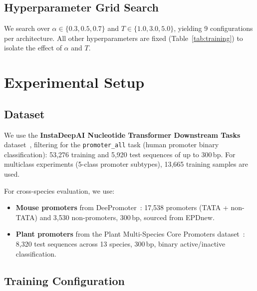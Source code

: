 \documentclass[conference]{IEEEtran}
\begin{document}
\subsection{Hyperparameter Grid Search}

We search over $\alpha \in \{0.3, 0.5, 0.7\}$ and $T \in \{1.0, 3.0, 5.0\}$, yielding 9 configurations per architecture. All other hyperparameters are fixed (Table~\ref{tab:training}) to isolate the effect of $\alpha$ and $T$.

\section{Experimental Setup}
\label{sec:setup}

\subsection{Dataset}

We use the \textbf{InstaDeepAI Nucleotide Transformer Downstream Tasks} dataset~\cite{dallatorre2023nucleotide, instadeep2023dataset}, filtering for the \texttt{promoter\_all} task (human promoter binary classification): 53,276 training and 5,920 test sequences of up to 300\,bp. For multiclass experiments (5-class promoter subtypes), 13,665 training samples are used.

For cross-species evaluation, we use:
\begin{itemize}
    \item \textbf{Mouse promoters} from DeePromoter~\cite{oubounyt2019deepromoter}: 17,538 promoters (TATA + non-TATA) and 3,530 non-promoters, 300\,bp, sourced from EPDnew.
    \item \textbf{Plant promoters} from the Plant Multi-Species Core Promoters dataset~\cite{zhangtaolab2024plant}: 8,320 test sequences across 13 species, 300\,bp, binary active/inactive classification.
\end{itemize}

\subsection{Training Configuration}
\end{document}
